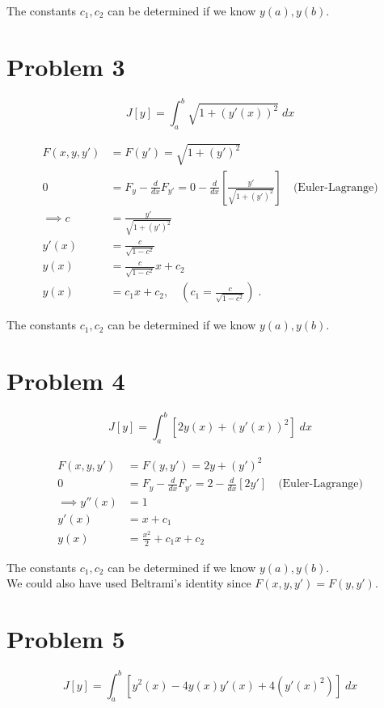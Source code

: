 \documentclass[a4paper]{article}
\begin{document}
The constants $c_1,c_2$ can be determined if we know $y(a),y(b)$.

\section*{Problem 3}

$$J[y] = \int_a^b \sqrt{1+(y'(x))^2} \; dx $$

\begin{align*}
F(x,y,y') &= F(y') = \sqrt{1 + (y')^2}\\
0 &= F_y - \frac{d}{dx}F_{y'} = 0 - \frac{d}{dx}\left[\frac{y'}{\sqrt{1+(y')^2}}\right] \quad \text{(Euler-Lagrange)} \\
\implies c &= \frac{y'}{\sqrt{1+(y')^2}}\\
y'(x) &= \frac{c}{\sqrt{1-c^2}} \\
y(x) &= \frac{c}{\sqrt{1-c^2}}x + c_2 \\
y(x) &= c_1x + c_2, \quad \left(c_1 = \frac{c}{\sqrt{1-c^2}} \right)\;.
\end{align*}

The constants $c_1,c_2$ can be determined if we know $y(a),y(b)$.

\section*{Problem 4}

$$J[y] = \int_a^b \left[2y(x) + (y'(x))^2\right] \; dx $$

\begin{align*}
F(x,y,y') &= F(y,y') = 2y + (y')^2\\
0 &= F_y - \frac{d}{dx}F_{y'} = 2 - \frac{d}{dx}\left[2y'\right] \quad \text{(Euler-Lagrange)} \\
\implies y''(x) &= 1 \\
y'(x) &= x + c_1 \\
y(x) &= \frac{x^2}{2} + c_1x + c_2
\end{align*}

The constants $c_1,c_2$ can be determined if we know $y(a),y(b)$.\\

We could also have used Beltrami's identity since $F(x,y,y') = F(y,y')$. 

\section*{Problem 5}

$$J[y] = \int_a^b \left[y^2(x) -4y(x)y'(x) + 4(y'(x)^2)\right] \; dx $$
\end{document}
